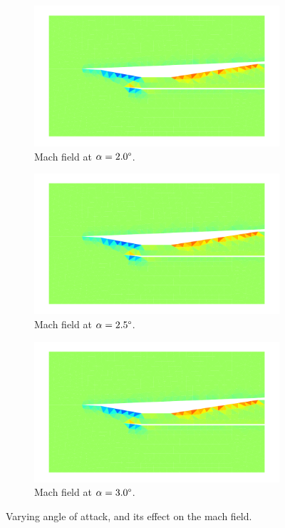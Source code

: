 \begin{figure}[h]
    \begin{subfigure}[h]{0.32\linewidth}
        \centering
        \includegraphics[width=\linewidth]{rep/q5/mach_a20.pdf}
        \caption{Mach field at $\alpha=2.0\degree$.}
    \end{subfigure}
    \begin{subfigure}[h]{0.32\linewidth}
        \centering
        \includegraphics[width=\linewidth]{rep/q5/mach_a25.pdf}
        \caption{Mach field at $\alpha=2.5\degree$.}
    \end{subfigure}
    \begin{subfigure}[h]{0.32\linewidth}
        \centering
        \includegraphics[width=\linewidth]{rep/q5/mach_a30.pdf}
        \caption{Mach field at $\alpha=3.0\degree$.}
    \end{subfigure}
    \caption[Mach Field with Varying Angle of Attack]{Varying angle of attack, and its effect on the mach field.}
\end{figure}

